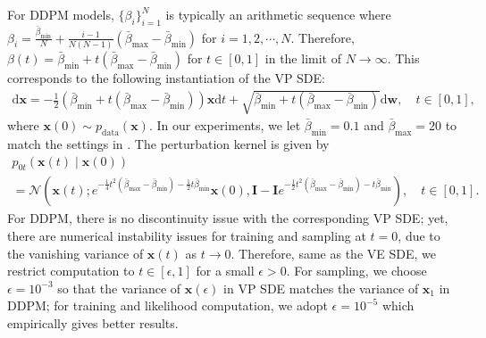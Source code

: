 \documentclass{article} \usepackage{iclr2021_conference,times}
\newcommand{\ud}{\mathrm{d}}
\newcommand{\mcal}{\mathcal}
\newcommand{\bfx}{\mathbf{x}}
\newcommand{\bfw}{\mathbf{w}}
\newcommand{\bfI}{\mathbf{I}}
\newcommand{\bbeta}{\bar{\beta}}
\newcommand{\bbetam}{\bbeta_{\text{min}}}
\newcommand{\bbetaM}{\bbeta_{\text{max}}}
\begin{document}
For DDPM models, $\{\beta_i\}_{i=1}^N$ is typically an arithmetic sequence where $\beta_i = \frac{\bbetam}{N} + \frac{i-1}{N(N-1)}(\bbetaM -\bbetam)$ for $i=1,2,\cdots, N$. Therefore, $\beta(t) = \bbetam + t(\bbetaM - \bbetam)$ for $t\in[0,1]$ in the limit of $N \to \infty$. This corresponds to the following instantiation of the VP SDE:
\begin{gather}
\ud \bfx = -\frac{1}{2}(\bbetam + t(\bbetaM - \bbetam)) \bfx \ud t + \sqrt{\bbetam + t(\bbetaM - \bbetam)} \ud \bfw, \quad t\in[0,1],
\end{gather}
where $\bfx(0) \sim p_\text{data}(\bfx)$. In our experiments, we let $\bbetam = 0.1$ and $\bbetaM = 20$ to match the settings in \citet{ho2020denoising}. The perturbation kernel is given by
\begin{multline}
    p_{0t}(\bfx(t) \mid \bfx(0)) \\
    = \mcal{N}\left(\bfx(t) ; e^{-\frac{1}{4}t^2(\bbetaM-\bbetam) - \frac{1}{2}t\bbetam}\bfx(0), \bfI - \bfI e^{-\frac{1}{2}t^2(\bbetaM -\bbetam) - t\bbetam} \right), \quad t\in[0,1].
\end{multline}
For DDPM, there is no discontinuity issue with the corresponding VP SDE; yet, there are numerical instability issues for training and sampling at $t=0$, due to the vanishing variance of $\bfx(t)$ as $t \to 0$. Therefore, same as the VE SDE, we restrict computation to $t\in[\epsilon, 1]$ for a small $\epsilon > 0$. For sampling, we choose $\epsilon=10^{-3}$ so that the variance of $\bfx(\epsilon)$ in VP SDE matches the variance of $\bfx_1$ in DDPM; for training and likelihood computation, we adopt $\epsilon=10^{-5}$ which empirically gives better results.
\end{document}
